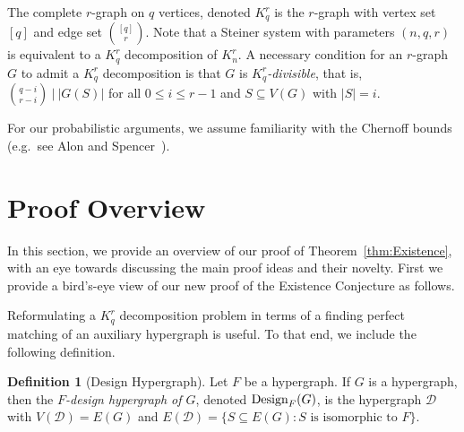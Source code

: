 \documentclass[11pt]{article}
\newcounter{i}
\theoremstyle{plain}
\theoremstyle{plain} %
\theoremstyle{definition}
\newtheorem{definition}[thm]{Definition}
\begin{document}
The complete $r$-graph on $q$ vertices, denoted $K_q^r$ is the $r$-graph with vertex set $[q]$ and edge set $\binom{[q]}{r}$. Note that a Steiner system with parameters $(n,q,r)$ is equivalent to a $K_q^r$ decomposition of $K_n^r$. A necessary condition for an $r$-graph $G$ to admit a $K_q^r$ decomposition is that $G$ is \emph{$K_q^r$-divisible}, that is, $\binom{q-i}{r-i}~|~|G(S)|$ for all $0\le i \le r-1$ and $S\subseteq V(G)$ with $|S|=i$. 

For our probabilistic arguments, we assume familiarity with the Chernoff bounds (e.g.~see Alon and Spencer~\cite{AS16}).

\section{Proof Overview}\label{s:ProofOverview}

In this section, we provide an overview of our proof of Theorem~\ref{thm:Existence}, with an eye towards discussing the main proof ideas and their novelty. First we provide a bird's-eye view of our new proof of the Existence Conjecture as follows.

Reformulating a $K_q^r$ decomposition problem in terms of a finding perfect matching of an auxiliary hypergraph is useful. To that end, we include the following definition.

\begin{definition}[Design Hypergraph]
Let $F$ be a hypergraph. If $G$ is a hypergraph, then the \emph{$F$-design hypergraph of $G$}, denoted ${\rm Design}_F(G)$, %
is the hypergraph $\mathcal{D}$ with $V(\mathcal{D})=E(G)$ and $E(\mathcal{D}) = \{S\subseteq E(G): S \text{ is isomorphic to } F\}$.
\end{definition}
\end{document}
